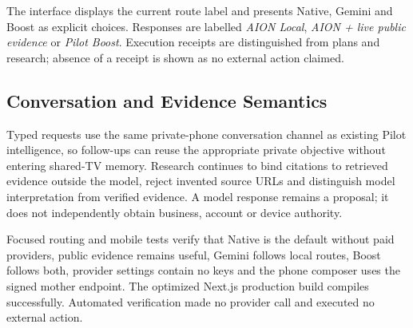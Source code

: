 The interface displays the current route label and presents Native, Gemini and Boost as explicit
choices.  Responses are labelled \emph{AION Local}, \emph{AION + live public evidence} or
\emph{Pilot Boost}.  Execution receipts are distinguished from plans and research; absence of a
receipt is shown as no external action claimed.

\subsection{Conversation and Evidence Semantics}

Typed requests use the same private-phone conversation channel as existing Pilot intelligence, so
follow-ups can reuse the appropriate private objective without entering shared-TV memory.  Research
continues to bind citations to retrieved evidence outside the model, reject invented source URLs
and distinguish model interpretation from verified evidence.  A model response remains a proposal;
it does not independently obtain business, account or device authority.

Focused routing and mobile tests verify that Native is the default without paid providers, public
evidence remains useful, Gemini follows local routes, Boost follows both, provider settings contain
no keys and the phone composer uses the signed mother endpoint.  The optimized Next.js production
build compiles successfully.  Automated verification made no provider call and executed no external
action.

\endgroup
